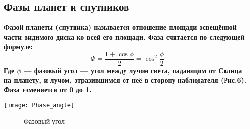 \subsection{Фазы планет и спутников}

\bfseries Фазой \mdseries планеты (cпутника) называется отношение площади освещённой  части видимого диска ко всей его площади.
Фаза считается по следующей формуле:
$$\Phi=\frac{1+\cos\phi}{2}=\cos^2\frac{\phi}{2}$$
Где $\phi$ --- \textbf{фазовый угол} --- угол между лучом света, падающим от Солнца на планету, и лучом, отразившимся от неё в сторону наблюдателя (Рис.6). Фаза изменяется от 0 до 1.
\begin{center}
\texttt{[image: Phase\_angle]}
\begin{figure}[h!]
\caption{Фазовый угол}
\end{figure}
\end{center}